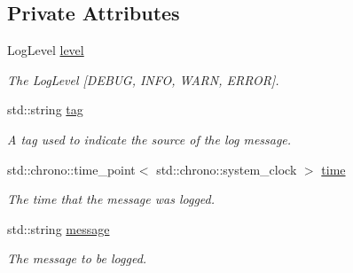 \subsection*{Private Attributes}
\begin{DoxyCompactItemize}
\item 
\mbox{\label{class_aws_1_1_iot_1_1_device_client_1_1_logging_1_1_log_message_a088cb79700c2bdaee0f2855963dead08}} 
Log\+Level \hyperlink{class_aws_1_1_iot_1_1_device_client_1_1_logging_1_1_log_message_a088cb79700c2bdaee0f2855963dead08}{level}
\begin{DoxyCompactList}\small\item\em The Log\+Level \mbox{[}D\+E\+B\+UG, I\+N\+FO, W\+A\+RN, E\+R\+R\+OR\mbox{]}. \end{DoxyCompactList}\item 
\mbox{\label{class_aws_1_1_iot_1_1_device_client_1_1_logging_1_1_log_message_a751caf3538bd2d0c4c5ba8b2a160699c}} 
std\+::string \hyperlink{class_aws_1_1_iot_1_1_device_client_1_1_logging_1_1_log_message_a751caf3538bd2d0c4c5ba8b2a160699c}{tag}
\begin{DoxyCompactList}\small\item\em A tag used to indicate the source of the log message. \end{DoxyCompactList}\item 
\mbox{\label{class_aws_1_1_iot_1_1_device_client_1_1_logging_1_1_log_message_ac527ebc5e1b1292741d830c1e5096cb9}} 
std\+::chrono\+::time\+\_\+point$<$ std\+::chrono\+::system\+\_\+clock $>$ \hyperlink{class_aws_1_1_iot_1_1_device_client_1_1_logging_1_1_log_message_ac527ebc5e1b1292741d830c1e5096cb9}{time}
\begin{DoxyCompactList}\small\item\em The time that the message was logged. \end{DoxyCompactList}\item 
\mbox{\label{class_aws_1_1_iot_1_1_device_client_1_1_logging_1_1_log_message_aef2c076d9c6cdf6890b71a63e4e02fc8}} 
std\+::string \hyperlink{class_aws_1_1_iot_1_1_device_client_1_1_logging_1_1_log_message_aef2c076d9c6cdf6890b71a63e4e02fc8}{message}
\begin{DoxyCompactList}\small\item\em The message to be logged. \end{DoxyCompactList}\end{DoxyCompactItemize}


